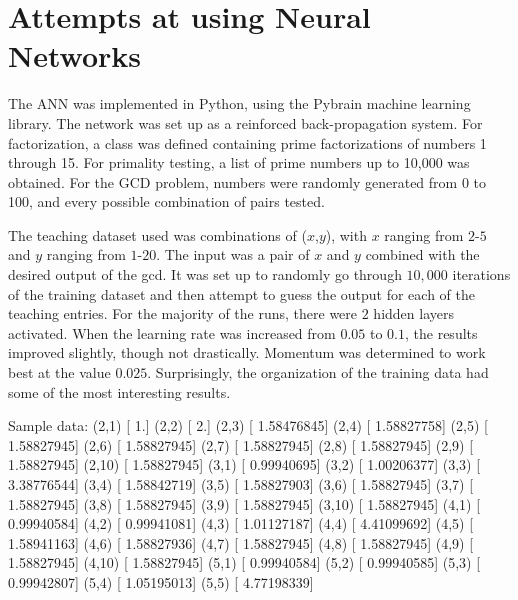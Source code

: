 \documentclass[8pt]{beamer}
\begin{document}
\section{Attempts at using Neural Networks}
\begin{frame}
The ANN was implemented in Python, using the Pybrain machine learning library.
The network was set up as a reinforced back-propagation system.
For factorization, a class was defined containing prime factorizations of numbers 1 through 15.
For primality testing, a list of prime numbers up to 10,000 was obtained.
For the GCD problem, numbers were randomly generated from 0 to 100, and every possible combination of pairs tested.
\end{frame}

\begin{frame}
The teaching dataset used was combinations of ($x$,$y$), with $x$ ranging from $2$-$5$ and $y$ ranging from $1$-$20$.  
The input was a pair of $x$ and $y$ combined with the desired output of the gcd.  It was set up to randomly go through $10,000$ iterations of the training dataset and then attempt to guess the output for each of the teaching entries.
For the majority of the runs, there were $2$ hidden layers activated.
When the learning rate was increased from $0.05$ to $0.1$, the results improved slightly, though not drastically.
Momentum was determined to work best at the value $0.025$.
Surprisingly, the organization of the training data had some of the most interesting results.
\end{frame}

\begin{frame}
Sample data:
(2,1) [ 1.]
(2,2) [ 2.]
(2,3) [ 1.58476845]
\newline (2,4) [ 1.58827758]
(2,5) [ 1.58827945]
(2,6) [ 1.58827945]
\newline (2,7)  [ 1.58827945]
(2,8) [ 1.58827945]
(2,9) [ 1.58827945]
\newline (2,10)  [ 1.58827945]
(3,1) [ 0.99940695]
(3,2) [ 1.00206377]
\newline (3,3) [ 3.38776544]
(3,4) [ 1.58842719]
(3,5) [ 1.58827903]
\newline (3,6) [ 1.58827945]
(3,7) [ 1.58827945]
(3,8) [ 1.58827945]
\newline (3,9) [ 1.58827945]
(3,10) [ 1.58827945]
(4,1) [ 0.99940584]
\newline (4,2) [ 0.99941081]
(4,3) [ 1.01127187]
(4,4) [ 4.41099692]
\newline (4,5) [ 1.58941163]
(4,6) [ 1.58827936]
(4,7) [ 1.58827945]
\newline (4,8) [ 1.58827945]
(4,9) [ 1.58827945]
(4,10) [ 1.58827945]
\newline (5,1) [ 0.99940584]
(5,2) [ 0.99940585]
(5,3) [ 0.99942807]
\newline (5,4) [ 1.05195013]
(5,5) [ 4.77198339]
\end{frame}
\end{document}
